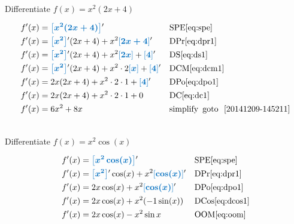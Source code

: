 \documentclass[20150903-160354-rs2.2-MarksMathNotebook.tex]{subfiles}
\begin{document}
\begin{example}[id:20141209-144203] \label{20141209-144203} \hfill \\

Differentiate $f(x)=x^2(2x+4)$

\soln

\solnsteps
\begin{align*}
f'(x)&= \farg{x^2(2x+4)}' && \text{SPE} \eqref{eq:spe} \\
f'(x)&= \farg{x^2}'(2x+4)+x^2\farg{2x+4}' && \text{DPr} \eqref{eq:dpr1} \\
f'(x)&= \farg{x^2}'(2x+4)+x^2\farg{2x}+\farg{4}' && \text{DS} \eqref{eq:ds1} \\
f'(x)&= \farg{x^2}'(2x+4)+x^2 \cdot 2 \farg{x}+\farg{4}' && \text{DCM} \eqref{eq:dcm1} \\
f'(x)&= 2x(2x+4)+ x^2\cdot 2 \cdot 1 + \farg{4}' && \text{DPo} \eqref{eq:dpo1} \\
f'(x)&= 2x(2x+4)+ x^2\cdot 2 \cdot 1 + 0 && \text{DC} \eqref{eq:dc1} \\
f'(x)&= 6x^2+8x && \text{simplify} \text{\, goto \,} \, \ref{20141209-145211}\\
\end{align*}
\end{example}


\begin{example}[id:20141209-142321] \label{20141209-142321} \hfill \\

Differentiate $f(x)=x^2 \cos(x)$

\soln

\solnsteps
\begin{align*}
f'(x)&= \farg{x^2 \cos(x)}' && \text{SPE} \eqref{eq:spe} \\
f'(x)&= \farg{x^2}' \cos(x) + x^2 \farg{\cos (x)}' && \text{DPr} \eqref{eq:dpr1} \\
f'(x)&= 2x \cos (x) + x^2 \farg{\cos (x)}' && \text{DPo} \eqref{eq:dpo1} \\
f'(x)&= 2x \cos (x) + x^2 (-1 \sin(x)) && \text{DCos} \eqref{eq:dcos1} \\
f'(x)&= 2x \cos (x) - x^2 \sin x && \text{OOM} \eqref{eq:oom}
\end{align*}
\end{example}
\end{document}
